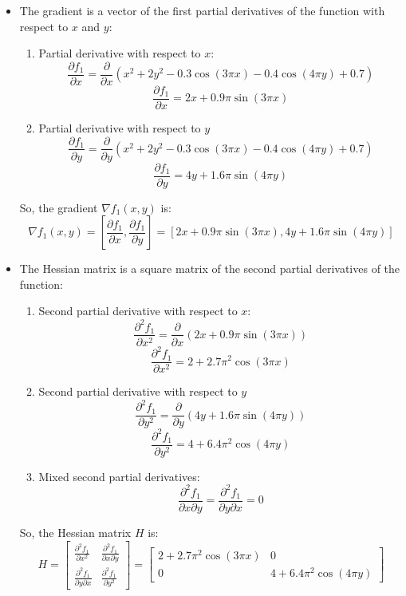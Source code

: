 \documentclass{article} %
\theoremstyle{definition}
\theoremstyle{remark}
\theoremstyle{plain}
\begin{document}
        \begin{itemize}
            \item The gradient is a vector of the first partial derivatives of the function with respect to \(x\) and \(y\):
            \begin{enumerate}
                \item Partial derivative with respect to \(x\):
                \[ \frac{\partial f_1}{\partial x} = \frac{\partial}{\partial x} \left( x^2 + 2y^2 - 0.3 \cos(3\pi x) - 0.4 \cos(4\pi y) + 0.7 \right) \]
                \[ \frac{\partial f_1}{\partial x} = 2x + 0.9\pi \sin(3\pi x) \]
                \item Partial derivative with respect to \(y\)
                \[ \frac{\partial f_1}{\partial y} = \frac{\partial}{\partial y} \left( x^2 + 2y^2 - 0.3 \cos(3\pi x) - 0.4 \cos(4\pi y) + 0.7 \right) \]
                \[ \frac{\partial f_1}{\partial y} = 4y + 1.6\pi \sin(4\pi y) \]
            \end{enumerate}
    
                So, the gradient \( \nabla f_1(x, y) \) is:
                \[ \nabla f_1(x, y) = \left[ \frac{\partial f_1}{\partial x}, \frac{\partial f_1}{\partial y} \right] = \left[ 2x + 0.9\pi \sin(3\pi x), 4y + 1.6\pi \sin(4\pi y) \right] \]

            \item The Hessian matrix is a square matrix of the second partial derivatives of the function:
            \begin{enumerate}
                \item Second partial derivative with respect to \( x \):
                \[ \frac{\partial^2 f_1}{\partial x^2} = \frac{\partial}{\partial x} \left( 2x + 0.9\pi \sin(3\pi x) \right) \]
                \[ \frac{\partial^2 f_1}{\partial x^2} = 2 + 2.7\pi^2 \cos(3\pi x) \]
                \item Second partial derivative with respect to \( y \)
                \[ \frac{\partial^2 f_1}{\partial y^2} = \frac{\partial}{\partial y} \left( 4y + 1.6\pi \sin(4\pi y) \right) \]
                \[ \frac{\partial^2 f_1}{\partial y^2} = 4 + 6.4\pi^2 \cos(4\pi y) \]
                \item Mixed second partial derivatives:
                \[ \frac{\partial^2 f_1}{\partial x \partial y} = \frac{\partial^2 f_1}{\partial y \partial x} = 0 \]
                
            \end{enumerate}
                So, the Hessian matrix \( H \) is:
                \[ H = \begin{bmatrix} \frac{\partial^2 f_1}{\partial x^2} & \frac{\partial^2 f_1}{\partial x \partial y} \\ \frac{\partial^2 f_1}{\partial y \partial x} & \frac{\partial^2 f_1}{\partial y^2} \end{bmatrix} = \begin{bmatrix} 2 + 2.7\pi^2 \cos(3\pi x) & 0 \\ 0 & 4 + 6.4\pi^2 \cos(4\pi y) \end{bmatrix} \]
        \end{itemize}
\end{document}
